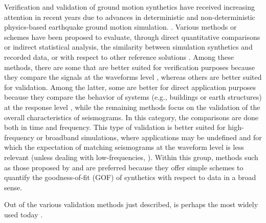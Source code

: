 
\introduction

Verification and validation of ground motion synthetics have received increasing attention in recent years due to advances in deterministic and non-deterministic physics-based earthquake ground motion simulation. . Various methods or schemes have been proposed to evaluate, through direct quantitative comparisons or indirect statistical analysis, the similarity between simulation synthetics and recorded data, or with respect to other reference solutions \citep{Anderson_2004_Proc, Kristekova_2006_BSSA, Kristekova_2009_GJI, Olsen_2010_SRL, Burks_BSSA_2014, Rezaeian_2015_BSSA}. Among these methods, there are some that are better suited for verification purposes because they compare the signals at the waveforms level \citep{Kristekova_2006_BSSA, Kristekova_2009_GJI}, whereas others are better suited for validation. Among the latter, some are better for direct application purposes because they compare the behavior of systems (e.g., buildings or earth structures) at the response level \citep{Burks_BSSA_2014}, while the remaining methods focus on the validation of the overall characteristics of seismograms. In this category, the comparisons are done both in time and frequency. This type of validation is better suited for high-frequency or broadband simulations, where applications may be undefined and for which the expectation of matching seismograms at the waveform level is less relevant (unless dealing with low-frequencies, ). Within this group, methods such as those proposed by \citet{Anderson_2004_Proc} and \citet{Olsen_2010_SRL} are preferred because they offer simple schemes to quantify the goodness-of-fit (GOF) of synthetics with respect to data in a broad sense. 

Out of the various validation methods just described, \citet{Anderson_2004_Proc} is perhaps the most widely used today \citep[e.g.,][]{Chaljub_2010_BSSA, Bielak_2010_GJI, Guidotti_2011_SRL, Maufroy_2015_BSSA}. 

